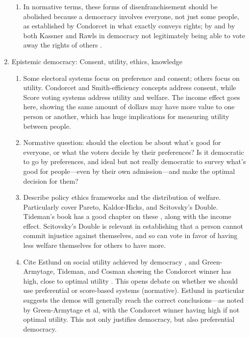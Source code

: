 \begin{enumerate}
\begin{enumerate}
        \item \philosophical In normative terms, these forms of disenfranchisement should be abolished because a democracy involves everyone, not just some people, as established by Condorcet in what exactly conveys rights; by and by both Kassner and Rawls in democracy not legitimately being able to vote away the rights of others \autocite{Kassner2006,Rawls1997}.
    \end{enumerate}

    \item Epistemic democracy:  Consent, utility, ethics, knowledge
    \begin{enumerate}
        \item \technical Some electoral systems focus on preference and consent; others focus on utility.  Condorcet and Smith-efficiency concepts address consent, while Score voting systems address utility and welfare.  The income effect goes here, showing the same amount of dollars may have more value to one person or another, which has huge implications for measuring utility between people.

        \item \philosophical Normative question:  should the election be about what's good for everyone, or what the voters decide by their preferences?  Is it democratic to go by preferences, and ideal but not really democratic to survey what's good for people—even by their own admission—and make the optimal decision for them?

        \item \technical Describe policy ethics frameworks and the distribution of welfare.  Particularly cover Pareto, Kaldor-Hicks, and Scitovsky's Double.  Tideman's book has a good chapter on these \autocite{Tideman2006}, along with the income effect.  Scitovsky's Double is relevant in establishing that a person cannot commit injustice against themselves, and so can vote in favor of having less welfare themselves for others to have more.

        \item \philosophical Cite Estlund on social utility achieved by democracy \autocite{Estlund2008}, and \technical Green-Armytage, Tideman, and Cosman showing the Condorcet winner has high, close to optimal utility \autocite{GreenArmytage2015}.  This opens debate on whether we should use preferential or score-based systems (normative).  Estlund in particular suggests the demos will generally reach the correct conclusions—as noted by Green-Armytage et al, with the Condorcet winner having high if not optimal utility.  This not only justifies democracy, but also preferential democracy.


\end{enumerate}
\end{enumerate}
